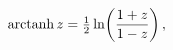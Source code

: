 \[\mathop{\mathrm{arctanh}\/}\nolimits z=\tfrac{1}{2}\mathop{\ln\/}\nolimits\!%
\left(\frac{1+z}{1-z}\right),\]